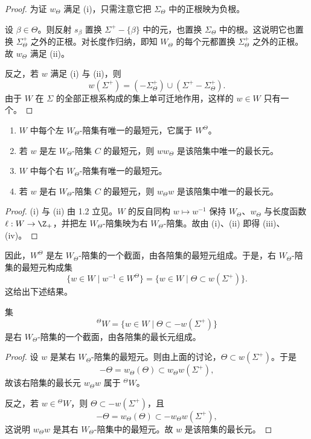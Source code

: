 \begin{proof}
为证 $w_\Theta$ 满足 (i)，只需注意它把 $\Sigma_\Theta$ 中的正根映为负根。

设 $\beta\in\Theta$。则反射 $s_\beta$ 置换 $\Sigma^+-\{\beta\}$ 中的元，也置换 $\Sigma_\Theta$ 中的根。这说明它也置换 $\Sigma^+_\Theta$ 之外的正根。对长度作归纳，即知 $W_\Theta$ 的每个元都置换 $\Sigma^+_\Theta$ 之外的正根。故 $w_\Theta$ 满足 (ii)。

反之，若 $w$ 满足 (i) 与 (ii)，则
$$w(\Sigma^+)=(-\Sigma^+_\Theta)\cup(\Sigma^+-\Sigma^+_\Theta).$$
由于 $W$ 在 $\Sigma$ 的全部正根系构成的集上单可迁地作用，这样的 $w\in W$ 只有一个。
\end{proof}

\begin{theorem}\label{thm:06.1.4}
\begin{enumerate}[label=(\roman*)]
\item $W$ 中每个左 $W_\Theta$-陪集有唯一的最短元，它属于 $W^\Theta$。
\item 若 $w$ 是左 $W_\Theta$-陪集 $C$ 的最短元，则 $ww_\Theta$ 是该陪集中唯一的最长元。
\item $W$ 中每个右 $W_\Theta$-陪集有唯一的最短元。
\item 若 $w$ 是右 $W_\Theta$-陪集 $C$ 的最短元，则 $w_\Theta w$ 是该陪集中唯一的最长元。
\end{enumerate}
\end{theorem}

\begin{proof}
(i) 与 (ii) 由 1.2 立见。$W$ 的反自同构 $w\mapsto w^{-1}$ 保持 $W_\Theta$、$w_\Theta$ 与长度函数 $\ell:W\to\Z_+$，并把左 $W_\Theta$-陪集映为右 $W_\Theta$-陪集。故由 (i)、(ii) 即得 (iii)、(iv)。
\end{proof}

因此，$W^\Theta$ 是左 $W_\Theta$-陪集的一个截面，由各陪集的最短元组成。于是，右 $W_\Theta$-陪集的最短元构成集
$$\{w\in W\mid w^{-1}\in W^\Theta\}=\{w\in W\mid\Theta\subset w(\Sigma^+)\}.$$
这给出下述结果。

\begin{lemma}\label{lem:06.1.5}
集
$${}^{\Theta}W=\{w\in W\mid\Theta\subset-w(\Sigma^+)\}$$
是右 $W_\Theta$-陪集的一个截面，由各陪集的最长元组成。
\end{lemma}

\begin{proof}
设 $w$ 是某右 $W_\Theta$-陪集的最短元。则由上面的讨论，$\Theta\subset w(\Sigma^+)$。于是
$$-\Theta=w_\Theta(\Theta)\subset w_\Theta w(\Sigma^+),$$
故该右陪集的最长元 $w_\Theta w$ 属于 ${}^{\Theta}W$。

反之，若 $w\in{}^{\Theta}W$，则 $\Theta\subset-w(\Sigma^+)$，且
$$-\Theta=w_\Theta(\Theta)\subset-w_\Theta w(\Sigma^+),$$
这说明 $w_\Theta w$ 是其右 $W_\Theta$-陪集中的最短元。故 $w$ 是该陪集的最长元。
\end{proof}


